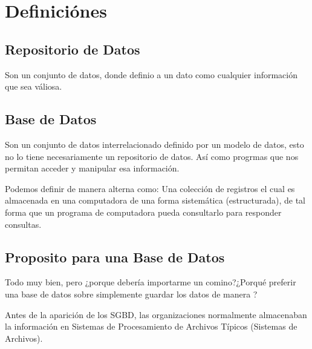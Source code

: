 \documentclass[12pt, fleqn]{report}                             %
\newcommand \Quote {\qq}                                        %
\begin{document}
    \chapter{Definiciónes}

        \clearpage
        \section{Repositorio de Datos}
            
            Son un conjunto de datos, donde definio a un dato como cualquier información
            que sea váliosa.




        \section{Base de Datos}

            Son un conjunto de datos interrelacionado definido por un modelo de datos, esto no lo
            tiene necesariamente un repositorio de datos. Así como progrmas que nos permitan acceder
            y manipular esa información.

            Podemos definir de manera alterna como: Una colección de registros el cual es almacenada
            en una computadora de una forma sistemática (estructurada), de tal forma que un programa
            de computadora pueda consultarlo para responder consultas.



        \section{Proposito para una Base de Datos}

            Todo muy bien, pero ¿porque debería importarme un comino?¿Porqué preferir una base de datos
            sobre simplemente guardar los datos de manera \Quote{común}?

            Antes de la aparición de los SGBD, las organizaciones normalmente almacenaban la
            información en Sistemas de Procesamiento de Archivos Típicos (Sistemas de Archivos).
\end{document}
